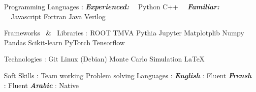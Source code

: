 

\begin{cvskills}

  \cvskill
{Programming Languages :} %
{\textbf{\emph{Experienced:}} \ \  Python \cpshalf C++ \ \ \textbf{\emph{Familiar:}} \ \  Javascript \cpshalf Fortran  \cpshalf Java \cpshalf Verilog} %

  \cvskill
    {Frameworks \ \& \ Libraries :} %
    {ROOT  \cpshalf  TMVA  \cpshalf  Pythia \cpshalf Jupyter \cpshalf Matplotplib \cpshalf Numpy \cpshalf Pandas \cpshalf Scikit-learn \cpshalf PyTorch \cpshalf Tensorflow} %



  \cvskill
    {Technologies :} %
    {Git  \cpshalf  Linux (Debian)  \cpshalf  Monte Carlo Simulation  \cpshalf  \LaTeX} %

      \cvskill
    {Soft Skills :} %
    {Team working  \cpshalf  Problem solving} %
      \cvskill
{Languages :} %
{\textbf{\emph{English}} : Fluent  \cpshalf  \textbf{\emph{Frensh}} : Fluent  \cpshalf  \textbf{\emph{Arabic}} : Native } %

\end{cvskills}
